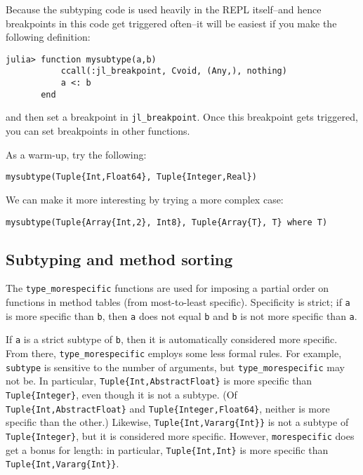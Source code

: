 Because the subtyping code is used heavily in the REPL itself–and hence breakpoints in this code get triggered often–it will be easiest if you make the following definition:




\begin{verbatim}
julia> function mysubtype(a,b)
           ccall(:jl_breakpoint, Cvoid, (Any,), nothing)
           a <: b
       end
\end{verbatim}



and then set a breakpoint in \texttt{jl\_breakpoint}.  Once this breakpoint gets triggered, you can set breakpoints in other functions.



As a warm-up, try the following:




\begin{verbatim}
mysubtype(Tuple{Int,Float64}, Tuple{Integer,Real})
\end{verbatim}



We can make it more interesting by trying a more complex case:




\begin{verbatim}
mysubtype(Tuple{Array{Int,2}, Int8}, Tuple{Array{T}, T} where T)
\end{verbatim}



\hypertarget{9271541181781970079}{}


\subsection{Subtyping and method sorting}



The \texttt{type\_morespecific} functions are used for imposing a partial order on functions in method tables (from most-to-least specific). Specificity is strict; if \texttt{a} is more specific than \texttt{b}, then \texttt{a} does not equal \texttt{b} and \texttt{b} is not more specific than \texttt{a}.



If \texttt{a} is a strict subtype of \texttt{b}, then it is automatically considered more specific. From there, \texttt{type\_morespecific} employs some less formal rules. For example, \texttt{subtype} is sensitive to the number of arguments, but \texttt{type\_morespecific} may not be. In particular, \texttt{Tuple\{Int,AbstractFloat\}} is more specific than \texttt{Tuple\{Integer\}}, even though it is not a subtype.  (Of \texttt{Tuple\{Int,AbstractFloat\}} and \texttt{Tuple\{Integer,Float64\}}, neither is more specific than the other.)  Likewise, \texttt{Tuple\{Int,Vararg\{Int\}\}} is not a subtype of \texttt{Tuple\{Integer\}}, but it is considered more specific. However, \texttt{morespecific} does get a bonus for length: in particular, \texttt{Tuple\{Int,Int\}} is more specific than \texttt{Tuple\{Int,Vararg\{Int\}\}}.



